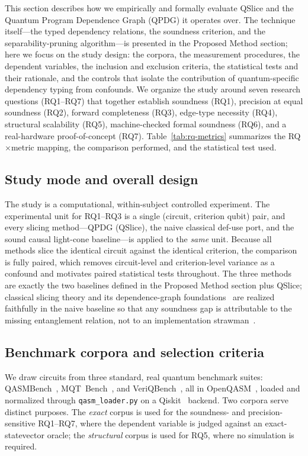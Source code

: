 \documentclass[10pt,conference]{IEEEtran}
\theoremstyle{definition}
\begin{document}
This section describes how we empirically and formally evaluate QSlice and the Quantum Program Dependence Graph (QPDG) it operates over. The technique itself---the typed dependency relations, the soundness criterion, and the separability-pruning algorithm---is presented in the Proposed Method section; here we focus on the study design: the corpora, the measurement procedures, the dependent variables, the inclusion and exclusion criteria, the statistical tests and their rationale, and the controls that isolate the contribution of quantum-specific dependency typing from confounds. We organize the study around seven research questions (RQ1--RQ7) that together establish soundness (RQ1), precision at equal soundness (RQ2), forward completeness (RQ3), edge-type necessity (RQ4), structural scalability (RQ5), machine-checked formal soundness (RQ6), and a real-hardware proof-of-concept (RQ7). Table~\ref{tab:rq-metrics} summarizes the RQ$\times$metric mapping, the comparison performed, and the statistical test used.

\subsection{Study mode and overall design}
The study is a computational, within-subject controlled experiment. The experimental unit for RQ1--RQ3 is a single (circuit, criterion qubit) pair, and every slicing method---QPDG (QSlice), the naive classical def-use port, and the sound causal light-cone baseline---is applied to the \emph{same} unit. Because all methods slice the identical circuit against the identical criterion, the comparison is fully paired, which removes circuit-level and criterion-level variance as a confound and motivates paired statistical tests throughout. The three methods are exactly the two baselines defined in the Proposed Method section plus QSlice; classical slicing theory and its dependence-graph foundations~\cite{ferrante1987pdg, horwitz1990interprocedural, tip1994a} are realized faithfully in the naive baseline so that any soundness gap is attributable to the missing entanglement relation, not to an implementation strawman~\cite{harman2008program}.

\subsection{Benchmark corpora and selection criteria}
We draw circuits from three standard, real quantum benchmark suites: QASMBench~\cite{li2023qasmbench}, MQT~Bench~\cite{quetschlich2023mqt}, and VeriQBench~\cite{chen2022veriqbench}, all in OpenQASM~\cite{cross2022openqasm3}, loaded and normalized through \texttt{qasm\_loader.py} on a Qiskit~\cite{qiskit2025} backend. Two corpora serve distinct purposes. The \emph{exact} corpus is used for the soundness- and precision-sensitive RQ1--RQ7, where the dependent variable is judged against an exact-statevector oracle; the \emph{structural} corpus is used for RQ5, where no simulation is required.
\end{document}
